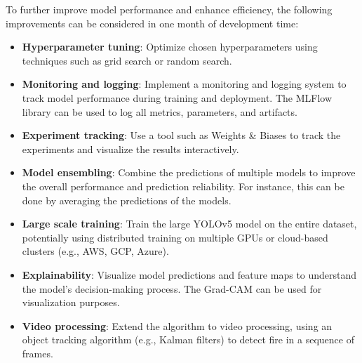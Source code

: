 \documentclass{article}
\begin{document}
To further improve model performance and enhance efficiency, the following improvements can be considered in one month of development time:

\begin{itemize}
    \item \textbf{Hyperparameter tuning}: Optimize chosen hyperparameters using techniques such as grid search or random search.
    \item \textbf{Monitoring and logging}: Implement a monitoring and logging system to track model performance during training and deployment. The MLFlow library can be used to log all metrics, parameters, and artifacts.
    \item \textbf{Experiment tracking}: Use a tool such as Weights \& Biases to track the experiments and visualize the results interactively.
    \item \textbf{Model ensembling}: Combine the predictions of multiple models to improve the overall performance and prediction reliability.  For instance, this can be done by averaging the predictions of the models.
    \item \textbf{Large scale training}: Train the large YOLOv5 model on the entire dataset, potentially using distributed training on multiple GPUs or cloud-based clusters (e.g., AWS, GCP, Azure).
    \item \textbf{Explainability}: Visualize model predictions and feature maps to understand the model's decision-making process. The Grad-CAM can be used for visualization purposes.
    \item \textbf{Video processing}: Extend the algorithm to video processing, using an object tracking algorithm (e.g., Kalman filters) to detect fire in a sequence of frames.
\end{itemize}
\end{document}
